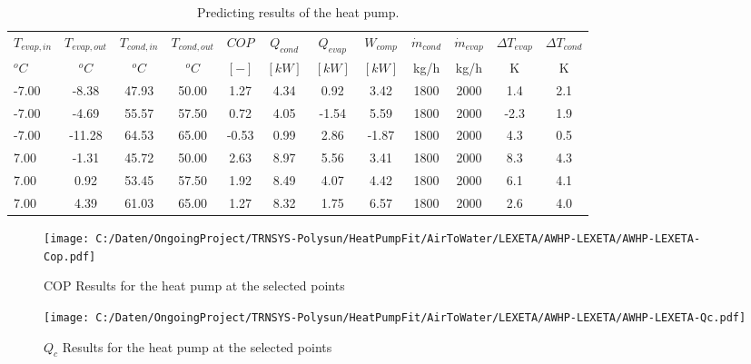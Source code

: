 \documentclass[english]{SPFShortReport}
\begin{document}
\begin{table}[!ht]
\begin{small}
\caption{Predicting results of the heat pump.}
\begin{center}
\resizebox{12cm}{!} 
{
\begin{tabular}{l | c c c c c c c c c c c } 
\hline
\hline
$T_{evap,in}$ &$T_{evap,out}$ &$T_{cond,in}$ &$T_{cond,out}$ &$COP$ &$Q_{cond}$ &$Q_{evap}$ &$W_{comp}$ &$\dot m_{cond}$ &$\dot m_{evap}$ &$\Delta T_{evap}$ &$\Delta T_{cond}$ \\ 
$^oC$ &$^oC$ &$^oC$ &$^oC$ &$[-]$ &$[kW]$ &$[kW]$ &$[kW]$ &kg/h &kg/h &K &K\\ 
\hline
-7.00 & -8.38 & 47.93 & 50.00 & 1.27 & 4.34 & 0.92 & 3.42 & 1800 & 2000 & 1.4 & 2.1\\ 
-7.00 & -4.69 & 55.57 & 57.50 & 0.72 & 4.05 & -1.54 & 5.59 & 1800 & 2000 & -2.3 & 1.9\\ 
-7.00 & -11.28 & 64.53 & 65.00 & -0.53 & 0.99 & 2.86 & -1.87 & 1800 & 2000 & 4.3 & 0.5\\ 
7.00 & -1.31 & 45.72 & 50.00 & 2.63 & 8.97 & 5.56 & 3.41 & 1800 & 2000 & 8.3 & 4.3\\ 
7.00 & 0.92 & 53.45 & 57.50 & 1.92 & 8.49 & 4.07 & 4.42 & 1800 & 2000 & 6.1 & 4.1\\ 
7.00 & 4.39 & 61.03 & 65.00 & 1.27 & 8.32 & 1.75 & 6.57 & 1800 & 2000 & 2.6 & 4.0\\ 
\hline
\hline
\end{tabular}
}
\label{ResultsTable}
\end{center}
\end{small}
\end{table}
\begin{figure}[!ht]
\begin{center}
\texttt{[image: C:/Daten/OngoingProject/TRNSYS-Polysun/HeatPumpFit/AirToWater/LEXETA/AWHP-LEXETA/AWHP-LEXETA-Cop.pdf]}
\caption{COP Results for the heat pump at the selected points}
\label{COPFig}
\end{center}
\end{figure}
\begin{figure}[!ht]
\begin{center}
\texttt{[image: C:/Daten/OngoingProject/TRNSYS-Polysun/HeatPumpFit/AirToWater/LEXETA/AWHP-LEXETA/AWHP-LEXETA-Qc.pdf]}
\caption{$Q_c$ Results for the heat pump at the selected points}
\label{QcFig}
\end{center}
\end{figure}
\end{document}
